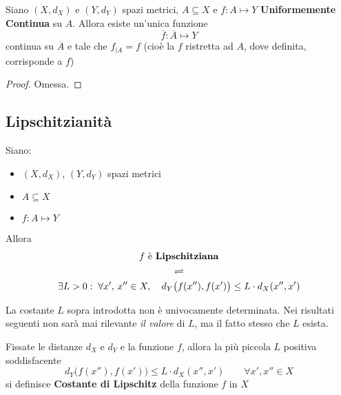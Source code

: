 \begin{proposition}
	Siano $(X,d_X)$ e $(Y,d_Y)$ spazi metrici, $A \subseteq X$ e $f:A \mapsto Y$ \textbf{Uniformemente Continua} su $A$. Allora esiste un'unica funzione
	\[\overline{f}: \overline{A} \mapsto Y\]
	continua su $\overline{A}$ e tale che $f_{|A} = f$ (cioè la $f$ ristretta ad $A$, dove definita, corrisponde a $f$)
	\begin{proof}
		Omessa.
	\end{proof}
\end{proposition}

\subsection{Lipschitzianità}
\begin{definition}
	\label{def:lips}
	Siano:
	\begin{itemize}
		\item $(X,d_X)$, $(Y,d_Y)$ spazi metrici
		\item $A \subseteq X$
		\item $f:A \mapsto Y$
	\end{itemize}
	Allora
	\begin{equation*}
		\begin{gathered}
			f \text{ è \textbf{Lipschitziana}}\\
			\rightleftharpoons\\
			\exists L > 0:\; \forall x',\,x'' \in X, \quad d_Y\bigl(f(x''),f(x')\bigr) \leq L \cdot d_X(x'',x')
		\end{gathered}
	\end{equation*}
	\begin{note}
		La costante $L$ sopra introdotta non è univocamente determinata. Nei risultati seguenti non sarà mai rilevante \textit{il valore} di $L$, ma il fatto stesso che $L$ esista.
	\end{note}
\end{definition}
\begin{definition}
	\label{def:cost_lips}
	Fissate le distanze $d_X$ e $d_Y$ e la funzione $f$, allora la più piccola $L$ positiva soddisfacente
	\[d_Y\bigl(f(x''),f(x')\bigr)\leq L \cdot d_X(x'',x') \qquad \forall x',x'' \in X\]
	si definisce \textbf{Costante di Lipschitz} della funzione $f$ in $X$
\end{definition}
